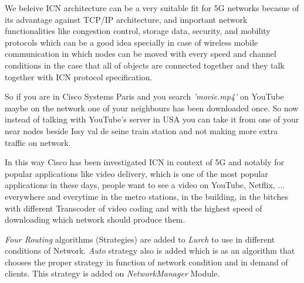  We beleive ICN architecture can be a very suitable fit for 5G networks becasue of its advantage against TCP/IP architecture, and important network functionalities like congestion control, storage data, security, and mobility protocols which can be a good idea specially in case of wireless mobile communication in which nodes can be moved with every speed and channel conditions in the case that all of objects are connected together and they talk together with ICN protocol specification.

So if you are in Cisco Systems Paris and you search \textit{'movie.mp4'} on YouTube maybe on the network one of your neighbours has been downloaded once. So now instead of talking with YouTube's server in USA you can take it from one of your near nodes beside Issy val de seine train station and not making more extra traffic on network.


In this way Cisco has been investigated ICN in context of 5G and notably for popular applications like video delivery, which is one of the most popular applications in these days, people want to see a video on YouTube, Netflix, ... everywhere and everytime in the metro stations, in the building, in the bitches with different Transcoder of video coding and with the highest speed of downloading which network should produce them.

\textit{Four Routing} algorithms (Strategies) are added to \textit{Lurch} to use in different conditions of Network. \textit{Auto} strategy also is added which is as an algorithm that chooses the proper strategy in function of network condition and in demand of clients. This strategy is added on \textit{NetworkManager} Module.








